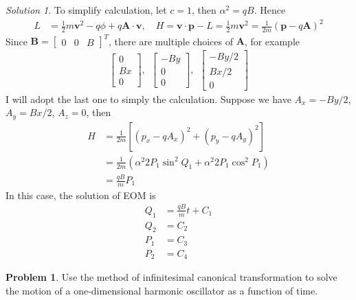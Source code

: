 \documentclass[twoside,11pt]{article}
\newcommand{\lms}{\fontfamily{lmss}\selectfont} %
\theoremstyle{definition}
\newtheorem{problem}{\lms Problem}
\theoremstyle{remark}
\newtheorem*{solution}{Solution}
\begin{document}
\begin{solution}
To simplify calculation, let $c=1$, then $\alpha^2 = qB$.
Hence
\begin{align*}
    L &= \frac{1}{2}m\mathbf{v}^2 - q\phi + q\mathbf{A}\cdot\mathbf{v},\quad
    H  = \mathbf{v}\cdot \mathbf{p} - L = \frac{1}{2}m\mathbf{v}^2 = \frac{1}{2m}(\mathbf{p} - q\mathbf{A})^2
\end{align*}
Since $\mathbf{B} = \begin{bmatrix}0 & 0 & B\end{bmatrix}^T$, there are multiple choices of $\mathbf{A}$,
for example 
\begin{align*}
    \begin{bmatrix}
        0 \\ Bx \\ 0
    \end{bmatrix},~~
    \begin{bmatrix}
        -By \\ 0 \\ 0
    \end{bmatrix},~~
    \begin{bmatrix}
        -By/2 \\ Bx/2 \\ 0
    \end{bmatrix}
\end{align*}
I will adopt the last one to simply the calculation.
Suppose we have $A_x = -By/2$, $A_y = Bx/2$, $A_z=0$, then
\begin{align*}
    H &= \frac{1}{2m}[(p_x - qA_x)^2 + (p_y - qA_y)^2] \\
      &= \frac{1}{2m}(\alpha^2 2P_1\sin^2 Q_1 + \alpha^2 2P_1\cos^2 P_1)\\
      &= \frac{qB}{m}P_1
\end{align*}
In this case, the solution of EOM is
\begin{align*}
    Q_1 &= \frac{qB}{m} t + C_1\\
    Q_2 &= C_2\\
    P_1 &= C_3\\
    P_2 &= C_4
\end{align*}


\end{solution}




\begin{problem}
Use the method of infinitesimal canonical transformation to solve the motion of
a one-dimensional harmonic oscillator as a function of time.
\end{problem}
\end{document}
